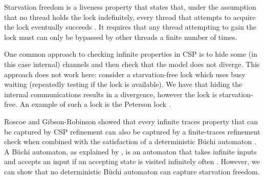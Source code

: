 Starvation freedom is a liveness property that states that, under the assumption that no thread holds the lock indefinitely, every thread that attempts to acquire the lock eventually succeeds \cite{TAoMP}. It requires that any thread attempting to gain the lock must can only be bypassed by other threads a finite number of times.

One common approach to checking infinite properties in CSP is to hide some (in this case internal) channels and then check that the model does not diverge. This approach does not work here: consider a starvation-free lock which uses busy waiting (repeatedly testing if the lock is available). We have that hiding the internal communications results in a divergence, however the lock is starvation-free. An example of such a lock is the Peterson lock .

Roscoe and Gibson-Robinson showed that every infinite traces property that can be captured by CSP refinement can also be captured by a finite-traces refinement check when combined with the satisfaction of a deterministic B{\"u}chi automaton \cite{RoscoeBuchi}. A B{\"u}chi automaton, as explained by , is an automaton that takes infinite inputs and accepts an input if an accepting state is visited infinitely often . However, we can show that no deterministic B{\"u}chi automaton can capture starvation freedom. 




